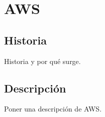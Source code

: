 \chapter{AWS}
\section{Historia}
Historia y por qué surge.

\section{Descripción}
Poner una descripción de AWS.